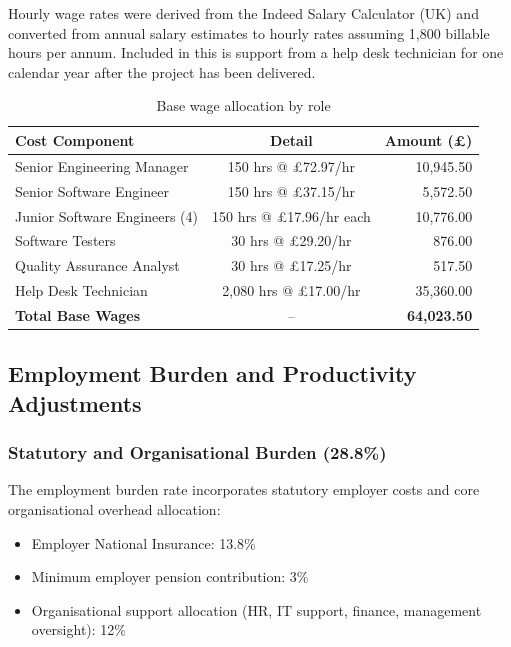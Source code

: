 \documentclass{article}
\begin{document}
Hourly wage rates were derived from the Indeed Salary Calculator (UK) \cite{indeed2025} 
and converted from annual salary estimates to hourly rates assuming 1,800 
billable hours per annum. Included in this is support from a help desk technician for one calendar year after the project has been delivered. 


\begin{table}[h]
\centering
\begin{tabular}{|l|c|r|}
\hline
\textbf{Cost Component} & \textbf{Detail} & \textbf{Amount (£)} \\
\hline
Senior Engineering Manager & 150 hrs @ £72.97/hr & 10,945.50 \\
Senior Software Engineer & 150 hrs @ £37.15/hr & 5,572.50 \\
Junior Software Engineers (4) & 150 hrs @ £17.96/hr each & 10,776.00 \\
Software Testers & 30 hrs @ £29.20/hr & 876.00 \\
Quality Assurance Analyst & 30 hrs @ £17.25/hr & 517.50 \\
Help Desk Technician & 2,080 hrs @ £17.00/hr & 35,360.00 \\
\hline
\textbf{Total Base Wages} & -- & \textbf{64,023.50} \\
\hline
\end{tabular}
\caption{Base wage allocation by role}
\end{table}

\subsection{Employment Burden and Productivity Adjustments}

\subsubsection*{Statutory and Organisational Burden (28.8\%)}

The employment burden rate incorporates statutory employer costs and 
core organisational overhead allocation:

\begin{itemize}[itemsep=2pt, topsep=4pt, parsep=0pt]
    \item Employer National Insurance: 13.8\%
    \item Minimum employer pension contribution: 3\%
    \item Organisational support allocation (HR, IT support, finance, management oversight): 12\%
\end{itemize}
\end{document}
